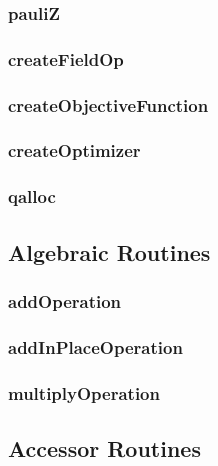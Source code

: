 \documentclass[10pt]{book}
\begin{document}
\subsubsection{\textbf{pauliZ}}\label{subsec:pauliz}


\subsubsection{\textbf{createFieldOp}}\label{subsec:createfieldop}


\subsubsection{\textbf{createObjectiveFunction}}\label{subsec:createobjfunc}


\subsubsection{\textbf{createOptimizer}}\label{subsec:createoptimizer}


\subsubsection{\textbf{qalloc}}\label{subsec:qalloc}


\subsection{Algebraic Routines}
\subsubsection{\textbf{addOperation}}\label{subsec:addop}


\subsubsection{\textbf{addInPlaceOperation}}\label{subsec:addinplaceop}


\subsubsection{\textbf{multiplyOperation}}\label{subsec:mulop}

 
\subsection{Accessor Routines}
\end{document}
